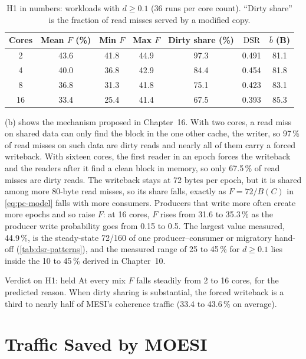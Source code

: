 \begin{table}[htbp]
\centering
\caption{H1 in numbers: workloads with $d \ge 0.1$ (36 runs per core count).
``Dirty share'' is the fraction of read misses served by a modified copy.}
\label{tab:res-h1}
\small
\begin{tabular}{@{}c c c c c c c@{}}
\toprule
Cores & Mean $F$ (\%) & Min $F$ & Max $F$ & Dirty share (\%) & $\mathrm{DSR}$ & $\bar b$ (B) \\
\midrule
2 & 43.6 & 41.8 & 44.9 & 97.3 & 0.491 & 81.1 \\
4 & 40.0 & 36.8 & 42.9 & 84.4 & 0.454 & 81.8 \\
8 & 36.8 & 31.3 & 41.8 & 75.1 & 0.423 & 83.1 \\
16 & 33.4 & 25.4 & 41.4 & 67.5 & 0.393 & 85.3 \\
\bottomrule
\end{tabular}
\end{table}

(b) shows the mechanism proposed in Chapter~16. With two cores, a
read miss on shared data can only find the block in the one other cache, the
writer, so 97\,\% of read misses on such data are dirty reads and nearly all of
them carry a forced writeback. With sixteen cores, the first reader in an epoch
forces the writeback and the readers after it find a clean block in memory, so only
67.5\,\% of read misses are dirty reads. The writeback stays at 72 bytes per epoch,
but it is shared among more 80-byte read misses, so its share falls, exactly as
$F=72/B(C)$ in \cref{eq:pc-model} falls with more consumers. Producers that write
more often create more epochs and so raise $F$: at 16 cores, $F$ rises from 31.6 to
35.3\,\% as the producer write probability goes from 0.15 to 0.5. The largest value
measured, 44.9\,\%, is the steady-state 72/160 of one producer--consumer or
migratory hand-off (\cref{tab:dsr-patterns}), and the measured range of 25 to
45\,\% for $d\ge0.1$ lies inside the 10 to 45\,\% derived in Chapter~10.

\begin{verdictbox}{Verdict on H1: held}
At every mix $F$ falls steadily from 2 to 16 cores, for the predicted reason. When
dirty sharing is substantial, the forced writeback is a third to nearly half of
MESI's coherence traffic (33.4 to 43.6\,\% on average).
\end{verdictbox}

\section{Traffic Saved by MOESI}
\label{sec:res-traffic}
%

